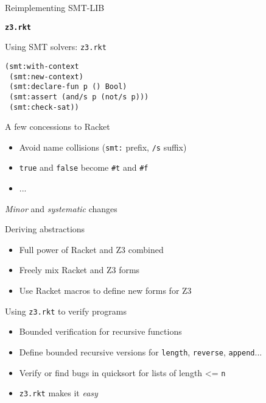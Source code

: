 \documentclass{beamer}
\begin{document}
\begin{frame}{Reimplementing SMT-LIB}
\begin{center}
\LARGE \texttt{\textbf{z3.rkt}} 
\end{center}
\end{frame}

\begin{frame}[fragile]{Using SMT solvers: \texttt{z3.rkt}}
\begin{verbatim}
(smt:with-context
 (smt:new-context)
 (smt:declare-fun p () Bool)
 (smt:assert (and/s p (not/s p)))
 (smt:check-sat))
\end{verbatim}
\end{frame}

\begin{frame}{A few concessions to Racket}
\begin{itemize}
\item Avoid name collisions (\texttt{smt:} prefix, \texttt{/s} suffix)
\item \texttt{true} and \texttt{false} become \texttt{\#t} and \texttt{\#f}
\item ...
\end{itemize}
\pause
\textit{Minor} and \textit{systematic} changes
\end{frame}

\begin{frame}{Deriving abstractions}
\begin{itemize}
\item Full power of Racket and Z3 combined
\item Freely mix Racket and Z3 forms
\pause
\item Use Racket macros to define new forms for Z3
\end{itemize}
\end{frame}

\begin{frame}{Using \texttt{z3.rkt} to verify programs}
\begin{itemize}
\item Bounded verification for recursive functions
\item Define bounded recursive versions for \texttt{length}, \texttt{reverse}, \texttt{append}...
\pause
\item Verify or find bugs in quicksort for lists of length <= \texttt{n}
\pause
\item \texttt{z3.rkt} makes it \textit{easy}
\end{itemize}
\end{frame}
\end{document}
